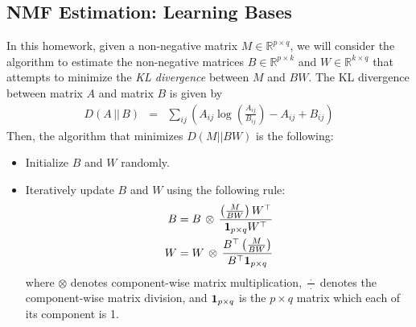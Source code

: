  
\subsection{NMF Estimation: Learning Bases}

In this homework, given a non-negative matrix $M \in \mathbb{R}^{p \times q}$, we will consider the algorithm to estimate the non-negative matrices $B \in \mathbb{R}^{p \times k}$ and $W \in \mathbb{R}^{k \times q}$ that attempts to minimize the \textit{KL divergence} between $M$ and $BW$. The KL divergence between matrix $A$ and matrix $B$ is given by
\begin{eqnarray}
        D(A \,  || \, B) & = & \sum_{ij} \left( A_{ij} \log \left( \frac{A_{ij}}{B_{ij}} \right) - A_{ij} + B_{ij} \right) 
    \end{eqnarray}
Then, the algorithm that minimizes $D(M || BW)$ is the following:
\begin{itemize}
    \item Initialize $B$ and $W$ randomly.
    \item Iteratively update $B$ and $W$ using the following rule:
    \begin{eqnarray}
        B = B \, \otimes \, \frac{\left( \frac{M}{BW} \right) W^\top}{{\bf 1}_{p \times q} W^\top} \\
        W = W \, \otimes \, \frac{B^\top \left( \frac{M}{BW} \right)}{B^\top {\bf 1}_{p \times q}}
    \end{eqnarray}
    where $\otimes$ denotes component-wise matrix multiplication, $\frac{\; \cdot \;}{\cdot}$ denotes the component-wise matrix division, and ${\bf 1}_{p \times q}$ is the $p \times q$ matrix which each of its component is 1.
\end{itemize}

